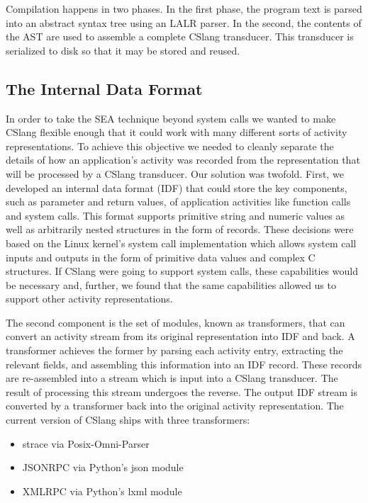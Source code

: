 Compilation happens in two phases.  In the first phase, the program text is
parsed into an abstract syntax tree using an LALR parser.
In the second, the
contents of the AST are used to assemble a complete CSlang transducer.
This transducer is serialized to
disk so that it may be stored and reused.


\subsection{The Internal Data Format}

In order to take the SEA technique beyond system calls we wanted to make
CSlang flexible enough that it could work with many different sorts of
activity representations.
To achieve this objective we needed to cleanly separate the details of how
an application's activity was recorded from the representation that will be
processed by a CSlang transducer.
Our solution was twofold.  First, we developed an internal data format
(IDF) that
could store the key components, such as parameter and return values,
of application activities like function
calls and system calls.  This format supports primitive string and numeric
values as well as arbitrarily nested structures in the form of records.
These decisions were based on the Linux kernel's system call implementation
which allows system call inputs and outputs in the form of primitive data
values and complex C structures.
If CSlang were going to support system calls, these capabilities would be
necessary and, further, we found that the same capabilities allowed us to
support other activity representations.

The second component is the set of modules, known as transformers, that can
convert an activity stream from its original representation into IDF and
back.  A transformer achieves the former by parsing each activity entry,
extracting the relevant fields, and assembling this information into an IDF
record.  These records are re-assembled into a stream which is input into a
CSlang transducer.  The result of processing this stream undergoes the
reverse.  The output IDF stream is converted by a transformer back into the
original activity representation.  The current version of CSlang ships with
three transformers:
\begin{itemize}
\item{strace via Posix-Omni-Parser}
\item{JSONRPC via Python's json module}
\item{XMLRPC via Python's lxml module}
\end{itemize}


